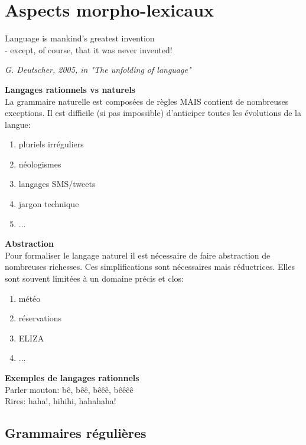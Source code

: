 \vspace{-1.2cm}

\section{Aspects morpho-lexicaux}

\epigraph{Language is mankind's greatest invention \\- except, of course, that it was never invented!}{\textit{G. Deutscher, 2005, in "The unfolding of language"}}

\textbf{Langages rationnels vs naturels}\\

La grammaire naturelle est composées de règles MAIS contient de nombreuses exceptions. Il est difficile (si pas impossible) d'anticiper toutes les évolutions de la langue:

\begin{enumerate}
    \item pluriels irréguliers
    \item néologismes
    \item langages SMS/tweets
    \item jargon technique
    \item ...
\end{enumerate}

\textbf{Abstraction}\\

Pour formaliser le langage naturel il est nécessaire de faire abstraction de nombreuses richesses. Ces simplifications sont nécessaires mais réductrices. Elles sont souvent limitées à un domaine précis et clos:

\begin{enumerate}
    \item météo
    \item réservations
    \item ELIZA
    \item ...
\end{enumerate}

\textbf{Exemples de langages rationnels}\\

\noindent Parler mouton: bê, bêê, bêêê, bêêêê\\
Rires: haha!, hihihi, hahahaha!

\subsection{Grammaires régulières}

